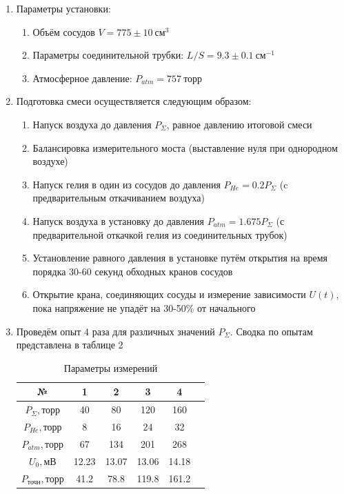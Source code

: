 \documentclass[a4paper,12pt]{article}
\begin{document}
\begin{enumerate}
\item Параметры установки:
    \begin{enumerate}
        \item Объём сосудов $V = 775 \pm 10 \ \text{см}^3$
        \item Параметры соединительной трубки: $L/S = 9.3 \pm 0.1 \ \text{см}^{-1}$
        \item Атмосферное давление: $P_{atm} = 757 \ \text{торр}$
    \end{enumerate}
\item Подготовка смеси осуществляется следующим образом:
    \begin{enumerate}
        \item Напуск воздуха до давления $P_\Sigma$, равное давлению итоговой смеси
        \item Балансировка измерительного моста (выставление нуля при однородном воздухе)
        \item Напуск гелия в один из сосудов до давления $P_{He} = 0.2 P_\Sigma$ (c предварительным откачиванием воздуха)
        \item Напуск воздуха в установку до давления $P_{atm} = 1.675 P_\Sigma $ (с предварительной откачкой гелия из соединительных трубок)
        \item Установление равного давления в установке путём открытия на время порядка 30-60 секунд обходных кранов сосудов
        \item Открытие крана, соединяющих сосуды и измерение зависимости $U(t)$, пока напряжение не упадёт на 30-50\% от начального

    \end{enumerate}
\item Проведём опыт 4 раза для различных значений $P_\Sigma$. Сводка по опытам представлена в таблице 2

\begin{center}
 \begin{table}[h!]
    \centering
    \caption{Параметры измерений}
    \begin{tabular}{|c|c|c|c|c|c|}
    \hline
    № & 1 & 2 & 3 & 4 \\ \hline
    $P_\Sigma, \text{торр}$ & 40 & 80 & 120 & 160 \\ \hline
    $P_{He}, \text{торр}$   & 8  & 16 & 24  & 32  \\ \hline
    $P_{atm},\text{торр}$   & 67 & 134 & 201 & 268 \\ \hline
    $U_0, \text{мВ}     $   & 12.23 & 13.07 & 13.06 & 14.18 \\ \hline
    $P_{\text{точн}}, \text{торр}$ & 41.2 & 78.8 & 119.8 & 161.2  \\ \hline
    \end{tabular}
    \end{table}
\end{center}


\end{enumerate}
\end{document}
